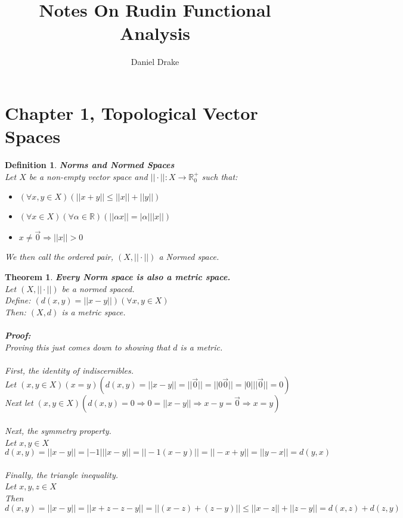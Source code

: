 \documentclass[12pt]{extarticle}
\title{Notes On Rudin Functional Analysis}
\author{Daniel Drake}
\theoremstyle{plain}
\newtheorem{thm}{Theorem}[section]
\theoremstyle{Definition}
\newtheorem{def.}{Definition}[section]
\theoremstyle{Definition}
\theoremstyle{plain}
\begin{document}
	\maketitle		
	\section{Chapter 1, Topological Vector Spaces} 
	\begin{def.} \textbf{Norms and Normed Spaces} \\ 
		Let $X$ be a non-empty vector space and $||\cdot|| : X \to \mathbb{R}^+_0$ such that:
		\begin{itemize}
			\item $(\forall x,y \in X)(||x + y|| \leq ||x|| + ||y||)$ 
			\item $(\forall x \in X)(\forall \alpha \in \mathbb{R})(||\alpha x|| = |\alpha|||x||)$
			\item $x \not= \vec{0} \Rightarrow ||x|| > 0$
		\end{itemize}
		We then call the ordered pair, $(X,||\cdot||)$ a Normed space. 
	\end{def.}
	\begin{thm} \textbf{Every Norm space is also a metric space.} \\
		Let $(X,||\cdot||)$ be a normed spaced. \\
		Define: $(d(x,y) = ||x - y||)(\forall x,y \in X)$ \\ 
		Then: $(X,d)$ is a metric space. \\ \\
		\textbf{Proof:} \\ 
		Proving this just comes down to showing that $d$ is a metric. \\ \\
		First, the identity of indiscernibles. \\ 
		Let $(x,y \in X)(x = y)(d(x,y) = ||x-y|| = ||\vec{0}|| = ||0\vec{0}|| = |0|||\vec{0}|| = 0)$ \\ 
		Next let $(x,y \in X)(d(x,y) = 0 \Rightarrow 0 = ||x-y|| \Rightarrow x-y = \vec{0} \Rightarrow x = y)$ \\ \\
		Next, the symmetry property. \\ 
		Let $x,y \in X$ \\ 
		$d(x,y) = ||x - y|| = |-1|||x - y|| = ||-1(x - y)|| = ||-x + y|| = ||y - x|| = d(y,x)$ \\ \\
		Finally, the triangle inequality. \\ 
		Let $x,y,z \in X$ \\ 
		Then $d(x,y) = ||x - y|| = ||x + z - z - y|| = ||(x - z) + ( z - y)|| \leq ||x - z|| + ||z - y|| = d(x,z) + d(z,y)$ 
	\end{thm}
\end{document}
